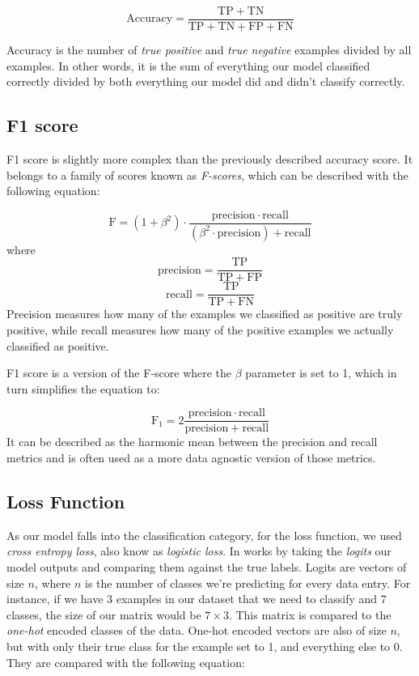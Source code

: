 \documentclass[times, utf8, diplomski, english]{fer_eng}
\begin{document}
\[ \mathrm{Accuracy} = \frac{\mathrm{TP} + \mathrm{TN}}{\mathrm{TP} + \mathrm{TN} + \mathrm{FP} + \mathrm{FN}} \]

Accuracy is the number of \textit{true positive} and \textit{true negative} examples divided by all examples. In other words, it is the sum of everything our model classified correctly divided by both everything our model did and didn't classify correctly.

\subsection{F1 score}
\label{subsec:f1 score}

F1 score is slightly more complex than the previously described accuracy score. It belongs to a family of scores known as \textit{F-scores}, which can be described with the following equation:

\[ \mathrm{F} = (1 + \beta^2) \cdot \frac{\mathrm{precision} \cdot \mathrm{recall}}{(\beta^2 \cdot \mathrm{precision}) + \mathrm{recall}} \] where \[ \mathrm{precision} = \frac{\mathrm{TP}}{\mathrm{TP} + \mathrm{FP}} \] \[ \mathrm{recall} = \frac{\mathrm{TP}}{\mathrm{TP} + \mathrm{FN}} \]
Precision measures how many of the examples we classified as positive are truly positive, while recall measures how many of the positive examples we actually classified as positive.

F1 score is a version of the F-score where the $\beta$ parameter is set to 1, which in turn simplifies the equation to:

\[ \mathrm{F_1} = 2 \frac{\mathrm{precision} \cdot \mathrm{recall}}{\mathrm{precision} + \mathrm{recall}} \]
It can be described as the harmonic mean between the precision and recall metrics and is often used as a more data agnostic version of those metrics.

\subsection{Loss Function}
\label{subsec:loss function}

As our model falls into the classification category, for the loss function, we used \textit{cross entropy loss}, also know as \textit{logistic loss}. In works by taking the \textit{logits} our model outputs and comparing them against the true labels. Logits are vectors of size $n$, where $n$ is the number of classes we're predicting for every data entry. For instance, if we have 3 examples in our dataset that we need to classify and 7 classes, the size of our matrix would be $7 \times 3$. This matrix is compared to the \textit{one-hot} encoded classes of the data. One-hot encoded vectors are also of size $n$, but with only their true class for the example set to 1, and everything else to 0. They are compared with the following equation:
\end{document}
